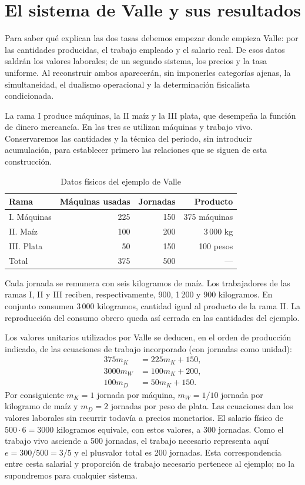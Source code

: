 \documentclass[10pt,twoside]{article}
\begin{document}
\section{El sistema de Valle y sus resultados}
Para saber qué explican las dos tasas debemos empezar donde empieza Valle: por las cantidades producidas, el trabajo empleado y el salario real. De esos datos saldrán los valores laborales; de un segundo sistema, los precios y la tasa uniforme. Al reconstruir ambos aparecerán, sin imponerles categorías ajenas, la simultaneidad, el dualismo operacional y la determinación fisicalista condicionada.

La rama I produce máquinas, la II maíz y la III plata, que desempeña la función de dinero mercancía. En las tres se utilizan máquinas y trabajo vivo. Conservaremos las cantidades y la técnica del periodo, sin introducir acumulación, para establecer primero las relaciones que se siguen de esta construcción.

\begin{table}[htbp]\centering\footnotesize
\caption{Datos físicos del ejemplo de Valle}
\begin{tabular}{@{}lrrr@{}}\toprule
Rama & Máquinas usadas & Jornadas & Producto\\\midrule
I. Máquinas & 225 & 150 & 375 máquinas\\
II. Maíz & 100 & 200 & 3\,000 kg\\
III. Plata & 50 & 150 & 100 pesos\\\midrule
Total & 375 & 500 & ---\\\bottomrule
\end{tabular}
\end{table}
Cada jornada se remunera con seis kilogramos de maíz. Los trabajadores de las ramas I, II y III reciben, respectivamente, 900, 1\,200 y 900 kilogramos. En conjunto consumen 3\,000 kilogramos, cantidad igual al producto de la rama II. La reproducción del consumo obrero queda así cerrada en las cantidades del ejemplo.

Los valores unitarios utilizados por Valle se deducen, en el orden de producción indicado, de las ecuaciones de trabajo incorporado (con jornadas como unidad):
\[
\begin{aligned}375m_K&=225m_K+150,\\3000m_W&=100m_K+200,\\100m_D&=50m_K+150.\end{aligned}
\]
Por consiguiente $m_K=1$ jornada por máquina, $m_W=1/10$ jornada por kilogramo de maíz y $m_D=2$ jornadas por peso de plata. Las ecuaciones dan los valores laborales sin recurrir todavía a precios monetarios. El salario físico de $500\cdot6=3000$ kilogramos equivale, con estos valores, a 300 jornadas. Como el trabajo vivo asciende a 500 jornadas, el trabajo necesario representa aquí $e=300/500=3/5$ y el plusvalor total es 200 jornadas. Esta correspondencia entre cesta salarial y proporción de trabajo necesario pertenece al ejemplo; no la supondremos para cualquier sistema.
\end{document}

